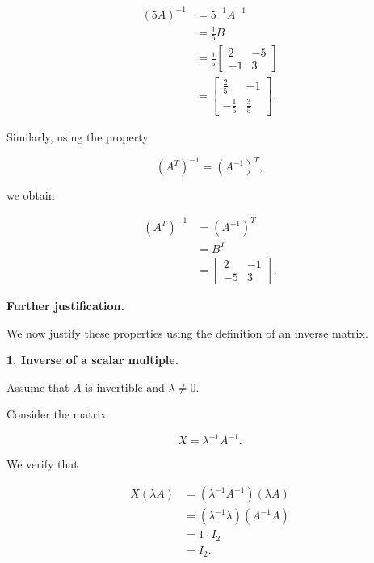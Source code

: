 \begin{enumerate}[label=\alph*)]
\begin{answer}
        $$
        \begin{aligned}
        (5A)^{-1}
            &=5^{-1}A^{-1}\\
            &=\frac15B\\
            &=\frac15
            \begin{bmatrix}
                2 & -5\\
                -1 & 3
            \end{bmatrix}\\
            &=
            \boxed{
            \begin{bmatrix}
                \frac25 & -1\\
                -\frac15 & \frac35
            \end{bmatrix}
            }.
        \end{aligned}
        $$

        Similarly, using the property

        $$
        (A^T)^{-1}=(A^{-1})^T,
        $$

        we obtain

        $$
        \begin{aligned}
        (A^T)^{-1}
            &=(A^{-1})^T\\
            &=B^T\\
            &=
            \boxed{
            \begin{bmatrix}
                2 & -1\\
                -5 & 3
            \end{bmatrix}
            }.
        \end{aligned}
        $$

        \medskip
        \noindent\textbf{Further justification.}

        We now justify these properties
        using the definition of an inverse matrix.

        \medskip
        \noindent\textbf{1. Inverse of a scalar multiple.}

        Assume that $A$ is invertible and
        $\lambda\neq0$.

        Consider the matrix

        $$
        X=\lambda^{-1}A^{-1}.
        $$

        We verify that

        $$
        \begin{aligned}
        X(\lambda A)
            &=(\lambda^{-1}A^{-1})(\lambda A)\\
            &=(\lambda^{-1}\lambda)(A^{-1}A)\\
            &=1\cdot I_2\\
            &=I_2.
        \end{aligned}
        $$


\end{answer}
\end{enumerate}
